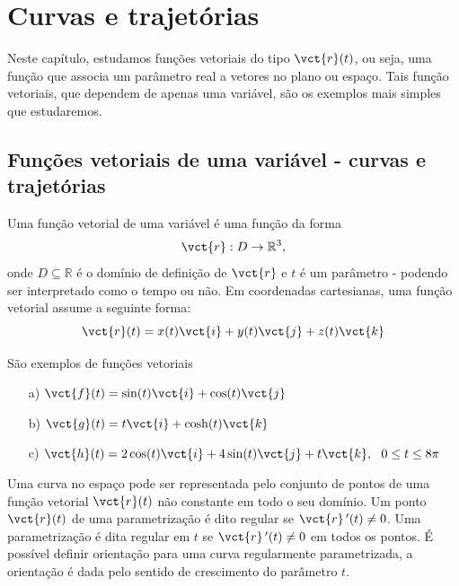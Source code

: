 

\chapter{Curvas e trajetórias}
  Neste capítulo, estudamos funções vetoriais do tipo $\vct{r}(t)$, ou seja, uma função que associa um parâmetro real a vetores no plano ou espaço. Tais função vetoriais, que dependem de apenas uma variável, são os exemplos mais simples que estudaremos. %

\section{Funções vetoriais de uma variável - curvas e trajetórias}
Uma função vetorial de uma variável é uma função da forma $$\vct{r}:D\to \mathbb{R}^3,$$ onde $D\subseteq \mathbb{R}$ é o domínio de definição de $\vct{r}$ e $t$ é um parâmetro - podendo ser interpretado como o tempo ou não. Em coordenadas cartesianas, uma função vetorial assume a seguinte forma:
$$\vct{r}(t)=x(t)\vct{i}+y(t)\vct{j}+z(t)\vct{k}$$
\begin{ex}\label{exfv1} São exemplos de funções vetoriais
\begin{itemize}
\item [a)] $\vct{f}(t)=\sin(t)\vct{i}+\cos(t)\vct{j}$
\item [b)] $\vct{g}(t)=t \vct{i}+\cosh(t)\vct{k}$
\item [c)] $\vct{h}(t)=2\cos(t)\vct{i}+4\sin(t)\vct{j}+t\vct{k},~~ 0\leq t \leq 8\pi$
\end{itemize}
\end{ex}  

Uma curva no espaço pode ser representada pelo conjunto de pontos de uma função vetorial $\vct{r}(t)$ não constante em todo o seu domínio. Um ponto $\vct{r}(t)$ de uma parametrização é dito regular se $\vct{r}\!~'(t)\neq 0$. Uma parametrização é dita regular em $t$ se $\vct{r}~\!'(t)\neq 0$ em todos os pontos. É possível definir orientação para uma curva regularmente parametrizada, a orientação é dada pelo sentido de crescimento do parâmetro $t$. 


